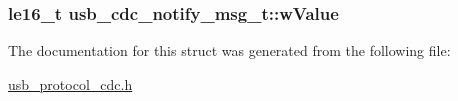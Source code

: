 \label{structusb__cdc__notify__msg__t_aee9ecbc7f624ac837f027332b1580b93}
\hypertarget{structusb__cdc__notify__msg__t_a6e2257375ef68c47f07c8dc504f75268}{
\subsubsection[{w\-Value}]{\setlength{\rightskip}{0pt plus 5cm}le16\-\_\-t {\bf usb\-\_\-cdc\-\_\-notify\-\_\-msg\-\_\-t\-::w\-Value}}}
\label{structusb__cdc__notify__msg__t_a6e2257375ef68c47f07c8dc504f75268}


\-The documentation for this struct was generated from the following file\-:\begin{DoxyCompactItemize}
\item 
\hyperlink{usb__protocol__cdc_8h}{usb\-\_\-protocol\-\_\-cdc.\-h}\end{DoxyCompactItemize}
